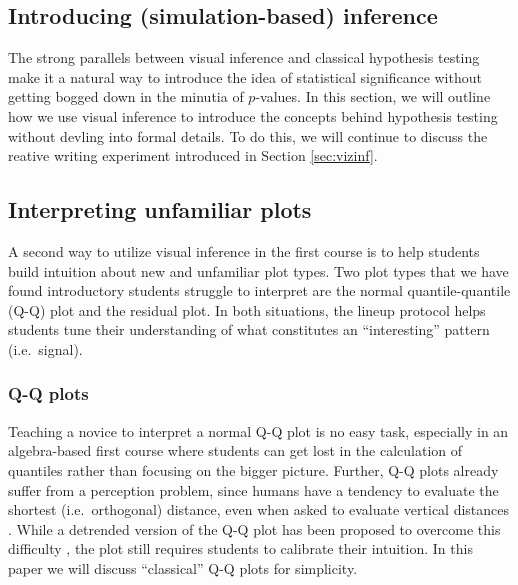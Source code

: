 \documentclass[12pt]{article}
\begin{document}
\hypertarget{introducing-simulation-based-inference}{%
\subsection{Introducing (simulation-based)
inference}\label{introducing-simulation-based-inference}}

The strong parallels between visual inference and classical hypothesis
testing make it a natural way to introduce the idea of statistical
significance without getting bogged down in the minutia of \(p\)-values.
In this section, we will outline how we use visual inference to
introduce the concepts behind hypothesis testing without devling into
formal details. To do this, we will continue to discuss the reative
writing experiment introduced in Section \ref{sec:vizinf}.

\hypertarget{interpreting-unfamiliar-plots}{%
\subsection{Interpreting unfamiliar
plots}\label{interpreting-unfamiliar-plots}}

A second way to utilize visual inference in the first course is to help
students build intuition about new and unfamiliar plot types. Two plot
types that we have found introductory students struggle to interpret are
the normal quantile-quantile (Q-Q) plot and the residual plot. In both
situations, the lineup protocol helps students tune their understanding
of what constitutes an ``interesting'' pattern (i.e.~signal).

\hypertarget{q-q-plots}{%
\subsubsection{Q-Q plots}\label{q-q-plots}}

Teaching a novice to interpret a normal Q-Q plot is no easy task,
especially in an algebra-based first course where students can get lost
in the calculation of quantiles rather than focusing on the bigger
picture. Further, Q-Q plots already suffer from a perception problem,
since humans have a tendency to evaluate the shortest (i.e.~orthogonal)
distance, even when asked to evaluate vertical distances
\citep{cleveland:1984, robbins:2005, sineillusion}. While a detrended
version of the Q-Q plot has been proposed to overcome this difficulty
\citep{Loy2016-fg}, the plot still requires students to calibrate their
intuition. In this paper we will discuss ``classical'' Q-Q plots for
simplicity.
\end{document}

